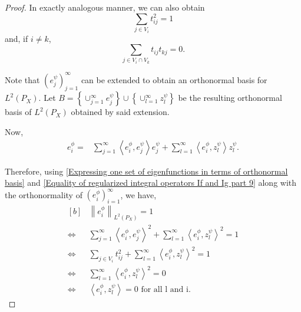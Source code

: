 \documentclass{article} %
\newcommand{\repone}{\phi}
\newcommand{\reptwo}{\psi}
\newcommand{\norm}[1]{\left\|#1\right\|}
\newcommand{\inprod}[1]{\left \langle #1 \right\rangle}
\newcommand{\LPtwo}{L^{2}(P_{X})}
\theoremstyle{plain}
\begin{document}
\begin{proof}
    In exactly analogous manner, we can also obtain 
    \begin{equation}\label{Equality of regularized integral operators If and Ig part 9}
        \sum_{j \in V_{i}}t_{ij}^{2} = 1
    \end{equation}
    and, if $i \neq k$,
    \begin{equation}\label{Equality of regularized integral operators If and Ig part 10}
        \sum_{j \in V_{i}\cap V_{k}}t_{ij}t_{kj}=0.
    \end{equation}

    Note that $(e_{j}^{\reptwo})_{j=1}^{\infty}$ can be extended to obtain an orthonormal basis for $\LPtwo$. Let $B=\left\{\cup_{j=1}^{\infty}e_{j}^{\reptwo}\right\} \cup \left\{\cup_{l=1}^{\infty}z_{l}^{\reptwo}\right\}$ be the resulting orthonormal basis of $\LPtwo$ obtained by said extension.

    Now,
    \begin{equation}\label{Expressing one set of eigenfunctions in terms of orthonormal basis}
        \begin{aligned}
            e_{i}^{\repone} =& \sum_{j=1}^{\infty} \inprod{e_{i}^{\repone},e_{j}^{\reptwo}}e_{j}^{\reptwo} + \sum_{l=1}^{\infty} \inprod{e_{i}^{\repone},z_{l}^{\reptwo}}z_{l}^{\reptwo}.
        \end{aligned}
    \end{equation}

    Therefore, using \eqref{Expressing one set of eigenfunctions in terms of orthonormal basis} and \eqref{Equality of regularized integral operators If and Ig part 9} along with the orthonormality of $(e_{i}^{\repone})_{i=1}^{\infty}$, we have,
     \begin{equation*}\label{Expressing one set of eigenfunctions in terms of other set of eigenfunctions}
        \begin{aligned}[b]
            &\norm{e_{i}^{\repone}}_{\LPtwo} = 1\\
            \iff &\sum_{j=1}^{\infty} \inprod{e_{i}^{\repone},e_{j}^{\reptwo}}^{2} + \sum_{l=1}^{\infty} \inprod{e_{i}^{\repone},z_{l}^{\reptwo}}^{2} = 1\\
            \iff & \sum_{j \in V_{i}} t_{ij}^{2} + \sum_{l=1}^{\infty} \inprod{e_{i}^{\repone},z_{l}^{\reptwo}}^{2} = 1\\
            \iff &  \sum_{l=1}^{\infty} \inprod{e_{i}^{\repone},z_{l}^{\reptwo}}^{2} = 0\\
            \iff & \inprod{e_{i}^{\repone},z_{l}^{\reptwo}} = 0 \textrm{ for all l and i}.
        \end{aligned}
    \end{equation*}


\end{proof}
\end{document}
